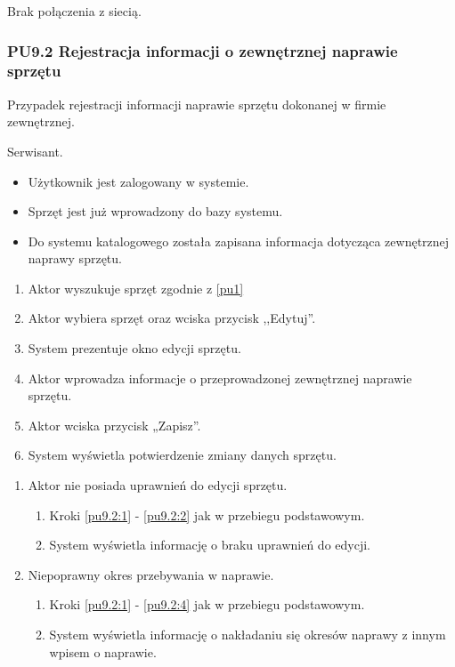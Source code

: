 Brak połączenia z siecią.

\subsubsection{PU9.2 Rejestracja informacji o zewnętrznej naprawie sprzętu}
Przypadek rejestracji informacji naprawie sprzętu dokonanej w firmie zewnętrznej.

Serwisant.

\begin{itemize}
\item Użytkownik jest zalogowany w systemie.
\item Sprzęt jest już wprowadzony do bazy systemu.
\end{itemize}

\begin{itemize}
\item Do systemu katalogowego została zapisana informacja dotycząca zewnętrznej naprawy sprzętu.
\end{itemize}

\begin{enumerate}
	\item \label{pu9.2:1} Aktor wyszukuje sprzęt zgodnie z \ref{pu1}
	\item \label{pu9.2:2} Aktor wybiera sprzęt oraz wciska przycisk ,,Edytuj''.
	\item System prezentuje okno edycji sprzętu.
	\item \label{pu9.2:4} Aktor wprowadza informacje o przeprowadzonej zewnętrznej naprawie sprzętu.
	\item Aktor wciska przycisk „Zapisz”.
	\item System wyświetla potwierdzenie zmiany danych sprzętu.
\end{enumerate}

\begin{enumerate}
	\item Aktor nie posiada uprawnień do edycji sprzętu.
	\begin{enumerate}[label*=\arabic*.]
		\item Kroki \ref{pu9.2:1} - \ref{pu9.2:2} jak w przebiegu podstawowym.
		\item System wyświetla informację o braku uprawnień do edycji.
	\end{enumerate}
	\item Niepoprawny okres przebywania w naprawie.
	\begin{enumerate}[label*=\arabic*.]
		\item Kroki \ref{pu9.2:1} - \ref{pu9.2:4} jak w przebiegu podstawowym.
		\item System wyświetla informację o nakładaniu się okresów naprawy z innym wpisem o naprawie.
	\end{enumerate}
\end{enumerate}

